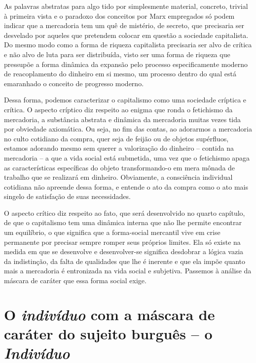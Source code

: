 As palavras abstratas para algo tido por simplesmente material,
concreto, trivial à primeira vista e o paradoxo dos conceitos por Marx
empregados só podem indicar que a mercadoria tem um quê de mistério, de
secreto, que precisaria ser desvelado por aqueles que pretendem colocar
em questão a sociedade capitalista. Do mesmo modo como a forma de
riqueza capitalista precisaria ser alvo de crítica e não alvo de luta
para ser distribuída, visto ser uma forma de riqueza que pressupõe a
forma dinâmica da expansão pelo processo especificamente moderno de
reacoplamento do dinheiro em si mesmo, um processo dentro do qual está
emaranhado o conceito de progresso moderno.

Dessa forma, podemos caracterizar o capitalismo como uma sociedade
críptica e crítica. O aspecto críptico diz respeito ao enigma que ronda
o fetichismo da mercadoria, a substância abstrata e dinâmica da
mercadoria muitas vezes tida por obviedade axiomática. Ou seja, no fim
das contas, ao adorarmos a mercadoria no culto cotidiano da compra, quer
seja de feijão ou de objetos supérfluos, estamos adorando mesmo sem
querer a valorização do dinheiro -- contida na mercadoria -- a que a
vida social está submetida, uma vez que o fetichismo apaga as
características específicas do objeto transformando-o em mera mônada de
trabalho que se realizará em dinheiro. Obviamente, a consciência
individual cotidiana não apreende dessa forma, e entende o ato da compra
como o ato mais singelo de satisfação de suas necessidades.

O aspecto crítico diz respeito ao fato, que será desenvolvido no quarto
capítulo, de que o capitalismo tem uma dinâmica interna que não lhe
permite encontrar um equilíbrio, o que significa que a forma-social
mercantil vive em crise permanente por precisar sempre romper seus
próprios limites. Ela só existe na medida em que se desenvolve e
desenvolver-se significa desdobrar a lógica vazia da indistinção, da
falta de qualidades que lhe é inerente e que ela impõe quanto mais a
mercadoria é entronizada na vida social e subjetiva. Passemos à análise
da máscara de caráter que essa forma social exige.

\section{O \emph{indivíduo} com a máscara de caráter do sujeito burguês -- o \emph{Indivíduo}}


